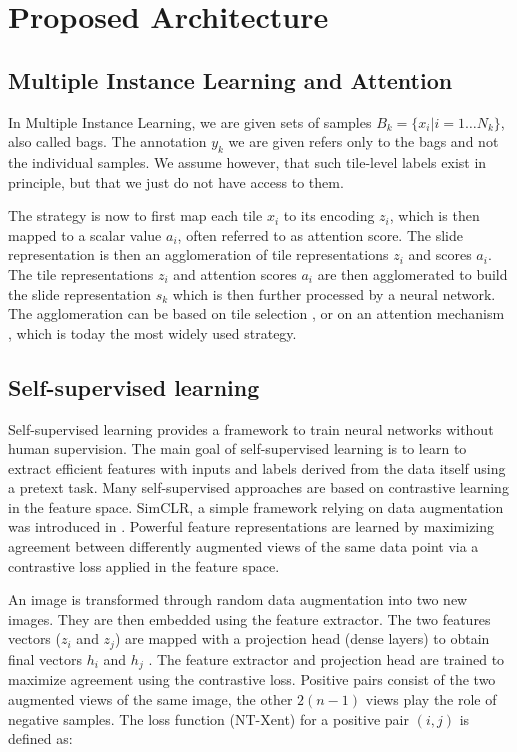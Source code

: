 \section{Proposed Architecture}

\subsection{Multiple Instance Learning and Attention}

In Multiple Instance Learning, we are given sets of samples $B_k = \{x_i | i = 1 \ldots N_k\}$, also called bags. The annotation $y_k$ we are given refers only to the bags and not the individual samples. We assume however, that such tile-level labels exist in principle, but that we just do not have access to them. 

The strategy is now to first map each tile $x_i$ to its encoding $z_i$, which is then mapped to a scalar value $a_i$, often referred to as attention score. The slide representation is then an agglomeration of tile representations $z_i$ and scores $a_i$. The tile representations $z_i$ and attention scores $a_i$ are then agglomerated to build the slide representation $s_k$ which is then further processed by a neural network. The agglomeration can be based on tile selection \citep{campanella_clinical-grade_2019, courtiol_classification_2020}, or on an attention mechanism \citep{ilse_attention-based_2018}, which is today the most widely used strategy. 

\subsection{Self-supervised learning}

Self-supervised learning provides a framework to train neural networks without human supervision. The main goal of self-supervised learning is to learn to extract efficient features with inputs and labels derived from the data itself using a pretext task. Many self-supervised approaches are based on contrastive learning in the feature space. SimCLR, a simple framework relying on data augmentation was introduced in \citep{chen_simple_2020}. Powerful feature representations are learned by maximizing agreement between differently augmented views of the same data point via a contrastive loss applied in the feature space.

An image is transformed through random data augmentation into two new images. They are then embedded using the feature extractor. The two features vectors ($z_i$ and $z_j$) are mapped with a projection head (dense layers) to obtain final vectors $h_i$ and $h_j$ . The feature extractor and projection head are trained to maximize agreement using the contrastive loss. Positive pairs consist of the two augmented views of the same image, the other $2( n - 1 )$ views play the role of negative samples.
The loss function (NT-Xent) for a positive pair $(i,j)$ is defined as:

